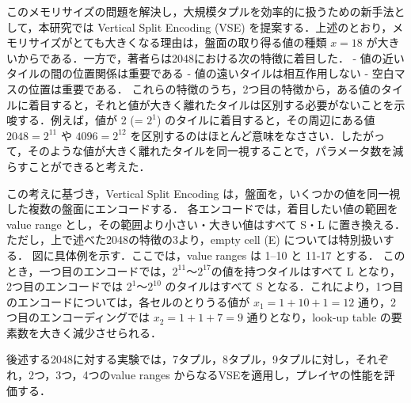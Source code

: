 このメモリサイズの問題を解決し，大規模タプルを効率的に扱うための新手法として，本研究では Vertical Split Encoding (VSE) を提案する．上述のとおり，メモリサイズがとても大きくなる理由は，盤面の取り得る値の種類 $x=18$ が大きいからである．一方で，著者らは2048における次の特徴に着目した．
- 値の近いタイルの間の位置関係は重要である
- 値の遠いタイルは相互作用しない
- 空白マスの位置は重要である．
これらの特徴のうち，2つ目の特徴から，ある値のタイルに着目すると，それと値が大きく離れたタイルは区別する必要がないことを示唆する．例えば，値が 2 (= $2^1$) のタイルに着目すると，その周辺にある値 $2048 = 2^{11}$ や $4096 = 2^{12}$ を区別するのはほとんど意味をなささい．したがって，そのような値が大きく離れたタイルを同一視することで，パラメータ数を減らすことができると考えた．

この考えに基づき，Vertical Split Encoding は，盤面を，いくつかの値を同一視した複数の盤面にエンコードする．
各エンコードでは，着目したい値の範囲を value range とし，その範囲より小さい・大きい値はすべて S・L に置き換える．
ただし，上で述べた2048の特徴の3より，empty cell (E) については特別扱いする．
図に具体例を示す．ここでは，value ranges は 1--10 と 11-17 とする．
このとき，一つ目のエンコードでは，$2^{11}$～$2^{17}$の値を持つタイルはすべて L となり，2つ目のエンコードでは
$2^{1}$～$2^{10}$ のタイルはすべて S となる．これにより，1つ目のエンコードについては，各セルのとりうる値が $x_1 = 1 + 10 + 1 = 12$ 通り，2つ目のエンコーディングでは $x_2 = 1 + 1 + 7 = 9$ 通りとなり，look-up table の要素数を大きく減少させられる．

後述する2048に対する実験では，7タプル，8タプル，9タプルに対し，それぞれ，2つ，3つ，4つのvalue ranges からなるVSEを適用し，プレイヤの性能を評価する．
